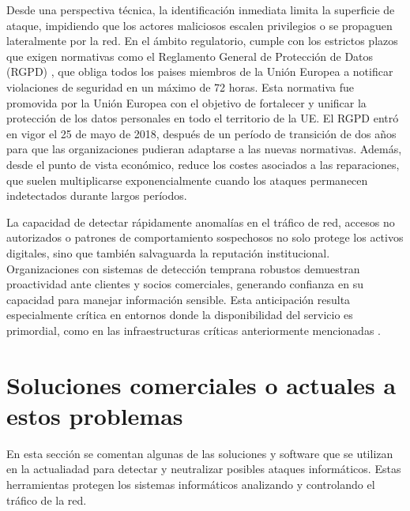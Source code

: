 Desde una perspectiva técnica, la identificación inmediata limita la superficie de ataque, impidiendo que los actores maliciosos escalen privilegios o se propaguen lateralmente por la red. En el ámbito regulatorio, cumple con los estrictos plazos que exigen normativas como el Reglamento General de Protección de Datos (RGPD) \cite{RGPD2016}, que obliga todos los paises miembros de la Unión Europea a notificar violaciones de seguridad en un máximo de 72 horas. Esta normativa fue promovida por la Unión Europea con el objetivo de fortalecer y unificar la protección de los datos personales en todo el territorio de la UE. El RGPD entró en vigor el 25 de mayo de 2018, después de un período de transición de dos años para que las organizaciones pudieran adaptarse a las nuevas normativas. Además, desde el punto de vista económico, reduce los costes asociados a las reparaciones, que suelen multiplicarse exponencialmente cuando los ataques permanecen indetectados durante largos períodos.


La capacidad de detectar rápidamente anomalías en el tráfico de red, accesos no autorizados o patrones de comportamiento sospechosos no solo protege los activos digitales, sino que también salvaguarda la reputación institucional. Organizaciones con sistemas de detección temprana robustos demuestran proactividad ante clientes y socios comerciales, generando confianza en su capacidad para manejar información sensible. Esta anticipación resulta especialmente crítica en entornos donde la disponibilidad del servicio es primordial, como en las infraestructuras críticas anteriormente mencionadas \cite{Sommestad2019}.

\section{Soluciones comerciales o actuales a estos problemas}

En esta sección se comentan algunas de las soluciones y software que se utilizan en la actualiadad para detectar y neutralizar posibles ataques informáticos. Estas herramientas protegen los sistemas informáticos analizando y controlando el tráfico de la red.

